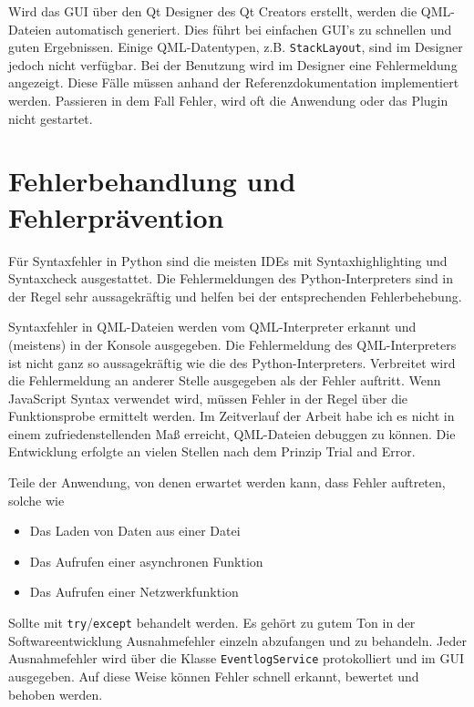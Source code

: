 \clearpage




Wird das GUI über den Qt Designer des Qt Creators erstellt, werden die QML-Dateien automatisch generiert.
Dies führt bei einfachen GUI's zu schnellen und guten Ergebnissen. 
Einige QML-Datentypen, z.B. \verb|StackLayout|, sind im Designer jedoch nicht verfügbar. Bei der Benutzung wird im Designer eine Fehlermeldung angezeigt. 
Diese Fälle müssen anhand der Referenzdokumentation implementiert werden.
Passieren in dem Fall Fehler, wird oft die Anwendung oder das Plugin nicht gestartet.

\section{Fehlerbehandlung und Fehlerprävention}

Für Syntaxfehler in Python sind die meisten IDEs mit Syntaxhighlighting und Syntaxcheck ausgestattet. 
Die Fehlermeldungen des Python-Interpreters sind in der Regel sehr aussagekräftig und helfen bei der entsprechenden Fehlerbehebung.

Syntaxfehler in QML-Dateien werden vom QML-Interpreter erkannt und (meistens) in der Konsole ausgegeben.
Die Fehlermeldung des QML-Interpreters ist nicht ganz so aussagekräftig wie die des Python-Interpreters.
Verbreitet wird die Fehlermeldung an anderer Stelle ausgegeben als der Fehler auftritt. 
Wenn JavaScript Syntax verwendet wird, müssen Fehler in der Regel über die Funktionsprobe ermittelt werden. 
Im Zeitverlauf der Arbeit habe ich es nicht in einem zufriedenstellenden Maß erreicht, QML-Dateien debuggen zu können. 
Die Entwicklung erfolgte an vielen Stellen nach dem Prinzip \grqq Trial and Error\grqq.

Teile der Anwendung, von denen erwartet werden kann, dass Fehler auftreten, solche wie
\begin{itemize}
    \item Das Laden von Daten aus einer Datei
    \item Das Aufrufen einer asynchronen Funktion
    \item Das Aufrufen einer Netzwerkfunktion
\end{itemize}

Sollte mit \verb|try|/\verb|except| behandelt werden. Es gehört zu gutem Ton in der Softwareentwicklung Ausnahmefehler einzeln abzufangen und zu behandeln. 
Jeder Ausnahmefehler wird über die Klasse \verb|EventlogService| protokolliert und im GUI ausgegeben.
Auf diese Weise können Fehler schnell erkannt, bewertet und behoben werden.


